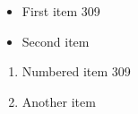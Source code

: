 \documentclass{article}
\begin{document}
\begin{itemize}
\item First item 309
\item Second item
\end{itemize}
\begin{enumerate}
\item Numbered item 309
\item Another item
\end{enumerate}
\end{document}
